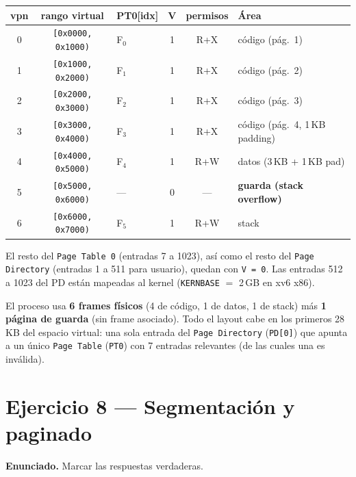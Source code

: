 \documentclass[11pt,a4paper]{article}
\begin{document}
\begin{center}
\small
\begin{tabular}{@{}cclccp{3.5cm}@{}}
\toprule
vpn & rango virtual              & PT0[idx]   & V & permisos & Área \\
\midrule
0   & \texttt{[0x0000, 0x1000)}  & F$_0$      & 1 & R+X      & código (pág.\ 1) \\
1   & \texttt{[0x1000, 0x2000)}  & F$_1$      & 1 & R+X      & código (pág.\ 2) \\
2   & \texttt{[0x2000, 0x3000)}  & F$_2$      & 1 & R+X      & código (pág.\ 3) \\
3   & \texttt{[0x3000, 0x4000)}  & F$_3$      & 1 & R+X      & código (pág.\ 4, 1\,KB padding) \\
4   & \texttt{[0x4000, 0x5000)}  & F$_4$      & 1 & R+W      & datos (3\,KB + 1\,KB pad) \\
5   & \texttt{[0x5000, 0x6000)}  & ---        & 0 & ---      & \textbf{guarda (stack overflow)} \\
6   & \texttt{[0x6000, 0x7000)}  & F$_5$      & 1 & R+W      & stack \\
\bottomrule
\end{tabular}
\end{center}

El resto del \texttt{Page Table 0} (entradas 7 a 1023), así como el
resto del \texttt{Page Directory} (entradas 1 a 511 para usuario),
quedan con \texttt{V = 0}. Las entradas 512 a 1023 del PD están
mapeadas al kernel (\texttt{KERNBASE} $=$ 2\,GB en xv6 x86).

\begin{respuesta}
El proceso usa \textbf{6 frames físicos} (4 de código, 1 de datos,
1 de stack) más \textbf{1 página de guarda} (sin frame asociado).
Todo el layout cabe en los primeros 28\,KB del espacio virtual:
una sola entrada del \texttt{Page Directory} (\texttt{PD[0]}) que
apunta a un único \texttt{Page Table} (\texttt{PT0}) con 7 entradas
relevantes (de las cuales una es inválida).
\end{respuesta}

\section{Ejercicio 8 --- Segmentación y paginado}

\textbf{Enunciado.} Marcar las respuestas verdaderas.
\end{document}

